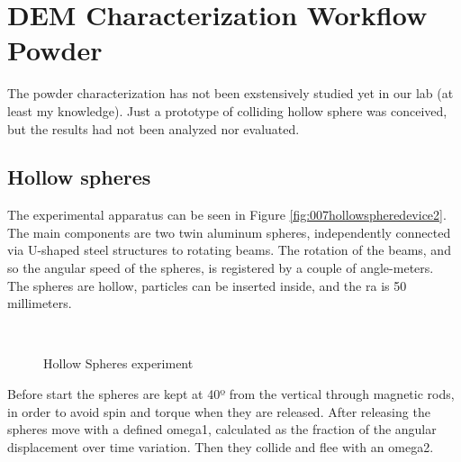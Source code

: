 
\section{DEM Characterization Workflow Powder}
\label{section:Demcharacterizationworkflowpowder}

The powder characterization has not been exstensively studied yet in our lab (at least my knowledge).
Just a prototype of colliding hollow sphere was conceived, but the results had not been analyzed nor evaluated.\\

\subsection{Hollow spheres}
\label{subsection:hollowspheres}

The experimental apparatus can be seen in Figure \ref{fig:007hollowspheredevice2}. The main components are two twin aluminum spheres, independently connected via U-shaped steel structures to rotating beams. The rotation of the beams, and so the angular speed of the spheres, is registered by a couple of angle-meters.\\
The spheres are hollow, particles can be inserted inside, and the \ac{ra} is 50 millimeters.\\

\begin{figure}[!h]
\centering
{}  \quad
{} \\
\caption[Hollow Spheres experiment]{Hollow Spheres experiment}
\label{fig:hollowspheres}
\end{figure}


Before start the spheres are kept at 40º from the vertical through magnetic rods, in order to avoid spin and torque when they are released.
After releasing the spheres move with a defined \ac{omega1}, calculated as the fraction of the angular displacement over time variation.
Then they collide and flee with an \ac{omega2}.\\

